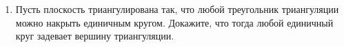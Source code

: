 \documentclass[12pt]{article}
\begin{document}
\begin{enumerate}
%
%
%
%
%
%
%
%

  \item Пусть плоскость триангулирована так, что любой треугольник триангуляции можно накрыть единичным кругом. Докажите, что тогда любой единичный круг задевает вершину триангуляции.


\end{enumerate}
\end{document}

